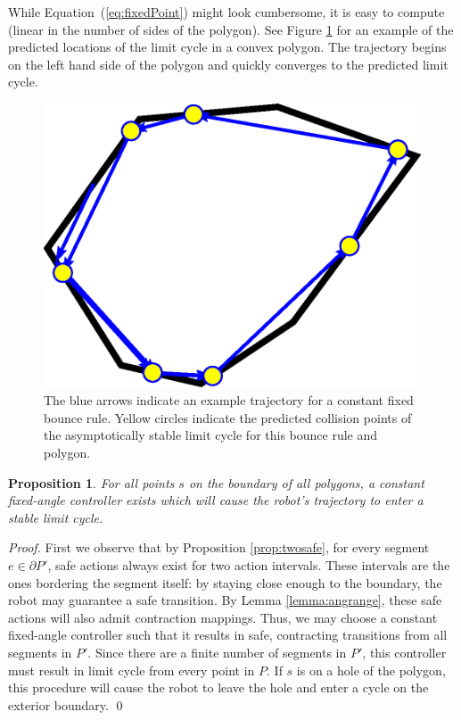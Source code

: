 \documentclass[sageh,times,Review]{sagej}
\newtheorem{proposition}{Proposition}
\begin{document}
While Equation~(\ref{eq:fixedPoint}) might look cumbersome, it is easy to compute (linear in the number of sides of the polygon). See Figure \ref{fig:fp} for an example of the predicted locations of the limit cycle in a convex polygon. The trajectory begins on the left hand side of the polygon and quickly converges to the predicted limit cycle.

\begin{figure}
\centering
\includegraphics[width=0.8\columnwidth]{fixed_points_prediction.eps}
\caption{The blue arrows indicate an example
trajectory for a constant fixed bounce rule. Yellow circles indicate the 
predicted collision points of the
asymptotically stable limit cycle for this bounce rule and polygon.}
\label{fig:fp}
\end{figure}


\begin{proposition} \label{prop:cycle}
For all points $s$ on the boundary of all polygons, a constant
fixed-angle controller exists which will cause the robot's trajectory to enter a
stable limit cycle.
\end{proposition}

\begin{proof}
First we observe that by Proposition \ref{prop:twosafe}, for every segment $e
\in \partial P'$, 
safe actions always exist
for two action intervals. These intervals are the ones bordering the segment itself:
by staying close enough to the boundary, the robot may guarantee a safe
transition. By Lemma \ref{lemma:angrange}, these safe actions will also
admit contraction mappings. Thus, we may choose a constant fixed-angle
controller such that it results in safe, contracting transitions from all
segments in $P'$. Since there are a finite number of segments in $P'$, this
controller must result in limit cycle from every point in $P$. If $s$ is on a
hole of the polygon, this procedure will cause the robot to leave the hole and
enter a cycle on the exterior boundary. \qed
\end{proof}
\end{document}
